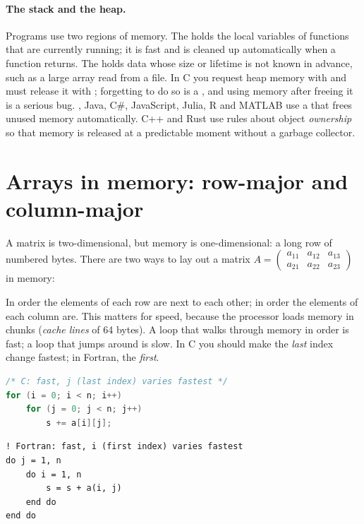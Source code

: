 \paragraph{The stack and the heap.}
Programs use two regions of memory. The  holds the local variables of
functions that are currently running; it is fast and is cleaned up automatically when a
function returns. The  holds data whose size or lifetime is not known in
advance, such as a large array read from a file. In C you request heap memory with
 and must release it with ; forgetting to do so is a , and using memory after freeing it is a serious bug. \py, Java, C\#, JavaScript,
Julia, R and MATLAB use a  that frees unused memory automatically.
C++ and Rust use rules about object \emph{ownership} so that memory is released at a
predictable moment without a garbage collector.

\section{Arrays in memory: row-major and column-major}
\label{sec:rowcolumn}

A matrix is two-dimensional, but memory is one-dimensional: a long row of numbered bytes.
There are two ways to lay out a matrix
$A = \begin{pmatrix} a_{11} & a_{12} & a_{13} \\ a_{21} & a_{22} & a_{23}\end{pmatrix}$
in memory:
\begin{center}
\end{center}
In  order the elements of each row are next to each other; in
 order the elements of each column are. This matters for speed,
because the processor loads memory in chunks (\emph{cache lines} of 64 bytes). A loop that
walks through memory in order is fast; a loop that jumps around is slow. In C you should
make the \emph{last} index change fastest; in Fortran, the \emph{first}.
\begin{lstlisting}[language=C]
/* C: fast, j (last index) varies fastest */
for (i = 0; i < n; i++)
    for (j = 0; j < n; j++)
        s += a[i][j];
\end{lstlisting}
\begin{lstlisting}[language={[08]Fortran}]
! Fortran: fast, i (first index) varies fastest
do j = 1, n
    do i = 1, n
        s = s + a(i, j)
    end do
end do
\end{lstlisting}


